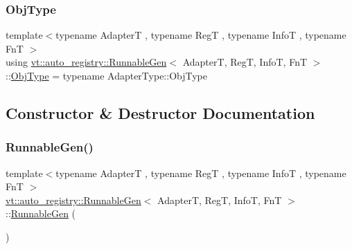 \mbox{\label{structvt_1_1auto__registry_1_1_runnable_gen_ac44cce5cd9a9d7bb5fc473c960240522}} 
\subsubsection{\texorpdfstring{Obj\+Type}{ObjType}}
{\footnotesize\ttfamily template$<$typename AdapterT , typename RegT , typename InfoT , typename FnT $>$ \\
using \hyperlink{structvt_1_1auto__registry_1_1_runnable_gen}{vt\+::auto\+\_\+registry\+::\+Runnable\+Gen}$<$ AdapterT, RegT, InfoT, FnT $>$\+::\hyperlink{structvt_1_1auto__registry_1_1_runnable_gen_ac44cce5cd9a9d7bb5fc473c960240522}{Obj\+Type} =  typename Adapter\+Type\+::\+Obj\+Type}



\subsection{Constructor \& Destructor Documentation}
\mbox{\label{structvt_1_1auto__registry_1_1_runnable_gen_a4c000355ca5c5713f7dea025a2babce3}} 
\subsubsection{\texorpdfstring{Runnable\+Gen()}{RunnableGen()}}
{\footnotesize\ttfamily template$<$typename AdapterT , typename RegT , typename InfoT , typename FnT $>$ \\
\hyperlink{structvt_1_1auto__registry_1_1_runnable_gen}{vt\+::auto\+\_\+registry\+::\+Runnable\+Gen}$<$ AdapterT, RegT, InfoT, FnT $>$\+::\hyperlink{structvt_1_1auto__registry_1_1_runnable_gen}{Runnable\+Gen} (\begin{DoxyParamCaption}{ }\end{DoxyParamCaption})\hspace{0.3cm}{\ttfamily [default]}}



